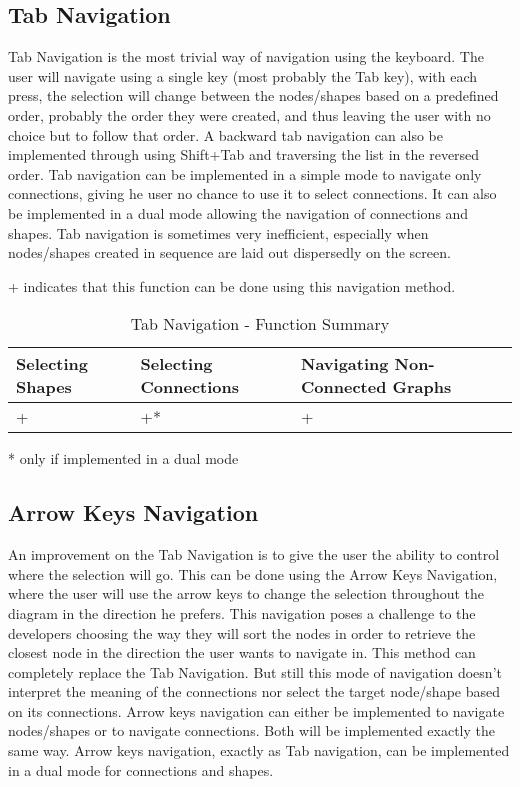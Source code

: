 \subsection{Tab Navigation}
Tab Navigation is the most trivial way of navigation using the keyboard. The user will navigate using a single key (most probably the Tab key), with each press, the selection will change between the nodes/shapes based on a predefined order, probably the order they were created, and thus leaving the user with no choice but to follow that order. A backward tab navigation can also be implemented through using Shift+Tab and traversing the list in the reversed order. Tab navigation can be implemented in a simple mode to navigate only connections, giving he user no chance to use it to select connections. It can also be implemented in a dual mode allowing the navigation of connections and shapes. Tab navigation is sometimes very inefficient, especially when nodes/shapes created in sequence are laid out dispersedly on the screen.

\begin{table}[!htb]
\begin{center}
\begin{flushleft}
\footnotesize
{+ indicates that this function can be done using this navigation method.}\\
\normalsize
\end{flushleft}
	\begin{tabular}{| l | l | l |}
	\hline
	Selecting Shapes & Selecting Connections & Navigating Non-Connected Graphs \\ \hline
	+ & +* & + \\ \hline
	\end{tabular}
\begin{flushleft}
\footnotesize
{* only if implemented in a dual mode}
\end{flushleft} 
\caption{Tab Navigation - Function Summary}
\end{center}
\end{table}

\subsection{Arrow Keys Navigation}
An improvement on the Tab Navigation is to give the user the ability to control where the selection will go. This can be done using the Arrow Keys Navigation, where the user will use the arrow keys to change the selection throughout the diagram in the direction he prefers. This navigation poses a challenge to the developers choosing the way they will sort the nodes in order to retrieve the closest node in the direction the user wants to navigate in. This method can completely replace the Tab Navigation. But still this mode of navigation doesn't interpret the meaning of the connections nor select the target node/shape based on its connections.
Arrow keys navigation can either be implemented to navigate nodes/shapes or to navigate connections. Both will be implemented exactly the same way. Arrow keys navigation, exactly as Tab navigation, can be implemented in a dual mode for connections and shapes.

